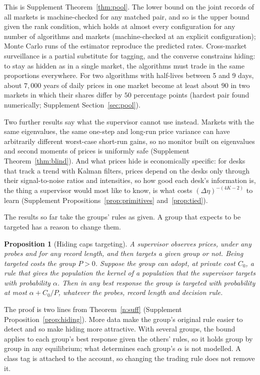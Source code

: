\documentclass[12pt]{article}
\newtheorem{proposition}[theorem]{Proposition}
\theoremstyle{definition}
\theoremstyle{remark}
\begin{document}
This is Supplement Theorem~\ref{thm:pool}. The lower bound on the joint records of all markets is machine-checked for any matched pair, and so is the upper bound given the rank condition, which holds at almost every configuration for any number of algorithms and markets (machine-checked at an explicit configuration); Monte Carlo runs of the estimator reproduce the predicted rates. Cross-market surveillance is a partial substitute for tagging, and the converse constrains hiding: to stay as hidden as in a single market, the algorithms must trade in the same proportions everywhere. For two algorithms with half-lives between 5 and 9 days, about $7{,}000$ years of daily prices in one market become at least about $90$ in two markets in which their shares differ by $50$ percentage points (hardest pair found numerically; Supplement Section~\ref{sec:pool}).

Two further results say what the supervisor cannot use instead. Markets with the same eigenvalues, the same one-step and long-run price variance can have arbitrarily different worst-case short-run gains, so no monitor built on eigenvalues and second moments of prices is uniformly safe (Supplement Theorem~\ref{thm:blind}). And what prices hide is economically specific: for desks that track a trend with Kalman filters, prices depend on the desks only through their signal-to-noise ratios and intensities, so how good each desk's information is, the thing a supervisor would most like to know, is what costs $(\Delta\eta)^{-(4K-2)}$ to learn (Supplement Propositions~\ref{prop:primitives} and~\ref{prop:tied}).

The results so far take the groups' rules as given. A group that expects to be targeted has a reason to change them.

\begin{proposition}[Hiding caps targeting]\label{n:hiding}
A supervisor observes prices, under any probes and for any record length, and then targets a given group or not. Being targeted costs the group $P>0$. Suppose the group can adopt, at private cost $C_0$, a rule that gives the population the kernel of a population that the supervisor targets with probability $\alpha$. Then in any best response the group is targeted with probability at most $\alpha+C_0/P$, whatever the probes, record length and decision rule.
\end{proposition}

The proof is two lines from Theorem~\ref{n:suff} (Supplement Proposition~\ref{prop:hiding}). More data make the group's original rule easier to detect and so make hiding more attractive. With several groups, the bound applies to each group's best response given the others' rules, so it holds group by group in any equilibrium; what determines each group's $\alpha$ is not modelled. A class tag is attached to the account, so changing the trading rule does not remove it.
\end{document}
